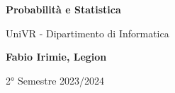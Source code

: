 \begin{titlepage}
	\begin{center}
		\vspace*{1cm}

		\Huge
		\textbf{Probabilità e Statistica}

		\vspace{0.5cm}
		\LARGE
		UniVR - Dipartimento di Informatica

		\vspace{1.5cm}

		\textbf{Fabio Irimie, Legion}

		\vfill


		\vspace{0.8cm}


		2° Semestre 2023/2024

	\end{center}
\end{titlepage}
